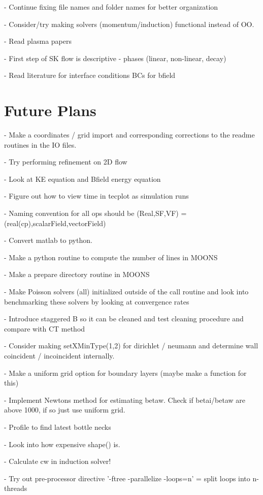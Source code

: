 \documentclass[11pt]{article}
\begin{document}
- Continue fixing file names and folder names for better organization

- Consider/try making solvers (momentum/induction) functional instead of OO.

- Read plasma papers

- First step of SK flow is descriptive - phases (linear, non-linear, decay)

- Read literature for interface conditions BCs for bfield

\section{Future Plans}

- Make a coordinates / grid import and corresponding corrections to the readme routines in the IO files.

- Try performing refinement on 2D flow

- Look at KE equation and Bfield energy equation

- Figure out how to view time in tecplot as simulation runs

- Naming convention for all ops should be (Real,SF,VF) = (real(cp),scalarField,vectorField)

- Convert matlab to python.

- Make a python routine to compute the number of lines in MOONS

- Make a prepare directory routine in MOONS

- Make Poisson solvers (all) initialized outside of the call routine and look into benchmarking these solvers by looking at convergence rates

- Introduce staggered B so it can be cleaned and test cleaning procedure and compare with CT method

- Consider making setXMinType(1,2) for dirichlet / neumann and determine wall coincident / incoincident internally.

- Make a uniform grid option for boundary layers (maybe make a function for this)

- Implement Newtons method for estimating betaw. Check if betai/betaw
are above 1000, if so just use uniform grid.

- Profile to find latest bottle necks

- Look into how expensive shape() is.

- Calculate cw in induction solver!

- Try out pre-processor directive '-ftree -parallelize -loops=n' = split loops into n-threads
\end{document}
